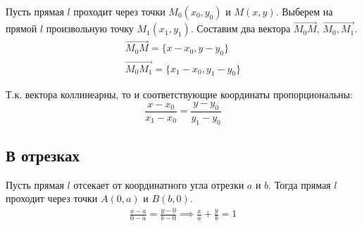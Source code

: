 Пусть прямая $l$ проходит через точки $M_0(x_0, y_0)$ и $M(x, y)$. Выберем на прямой $l$ произвольную точку $M_1(x_1, y_1)$. Составим два вектора $\overrightarrow{M_0M}$, $\overrightarrow{M_0, M_1}$.
\begin{gather*}
  \overrightarrow{M_0M} = \{x - x_0, y - y_0\} \\
  \overrightarrow{M_0M_1} = \{x_1 - x_0, y_1 - y_0\}
\end{gather*}

Т.к. вектора коллинеарны, то и соответствующие координаты пропорциональны:
 \[
  \boxed{\frac{x - x_0}{x_1 - x_0} = \frac{y - y_0}{y_1 - y_0}}
\]

\subsection{В отрезках}

Пусть прямая $l$ отсекает от координатного угла отрезки $a$ и $b$. Тогда прямая $l$ проходит через точки $A(0, a)$ и  $B(b, 0)$.
\begin{gather*}
  \frac{x - a}{0 - a} = \frac{y - 0}{b - 0} \implies \boxed{\frac{x}{a} + \frac{y}{b} = 1}
\end{gather*}


